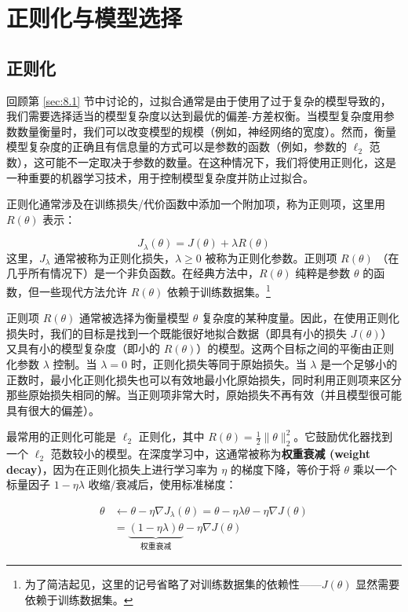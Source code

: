 \chapter{正则化与模型选择}\label{chapter:9}

\section{正则化}\label{sec:9.1}

回顾第 \ref{sec:8.1} 节中讨论的，过拟合通常是由于使用了过于复杂的模型导致的，我们需要选择适当的模型复杂度以达到最优的偏差-方差权衡。当模型复杂度用参数数量衡量时，我们可以改变模型的规模（例如，神经网络的宽度）。然而，衡量模型复杂度的正确且有信息量的方式可以是参数的函数（例如，参数的 $\ell_2$ 范数），这可能不一定取决于参数的数量。在这种情况下，我们将使用正则化，这是一种重要的机器学习技术，用于控制模型复杂度并防止过拟合。

正则化通常涉及在训练损失/代价函数中添加一个附加项，称为正则项，这里用 $R(\theta)$ 表示：

\begin{equation}
    J_\lambda(\theta) = J(\theta) + \lambda R(\theta)
    \label{eq:9.1}
\end{equation}
这里，$J_\lambda$ 通常被称为正则化损失，$\lambda \geq 0$ 被称为正则化参数。正则项 $R(\theta)$ （在几乎所有情况下）是一个非负函数。在经典方法中，$R(\theta)$ 纯粹是参数 $\theta$ 的函数，但一些现代方法允许 $R(\theta)$ 依赖于训练数据集。\footnote{为了简洁起见，这里的记号省略了对训练数据集的依赖性——$J(\theta)$ 显然需要依赖于训练数据集。}

正则项 $R(\theta)$ 通常被选择为衡量模型 $\theta$ 复杂度的某种度量。因此，在使用正则化损失时，我们的目标是找到一个既能很好地拟合数据（即具有小的损失 $J(\theta)$）又具有小的模型复杂度（即小的 $R(\theta)$）的模型。这两个目标之间的平衡由正则化参数 $\lambda$ 控制。当 $\lambda = 0$ 时，正则化损失等同于原始损失。当 $\lambda$ 是一个足够小的正数时，最小化正则化损失也可以有效地最小化原始损失，同时利用正则项来区分那些原始损失相同的解。当正则项非常大时，原始损失不再有效（并且模型很可能具有很大的偏差）。

最常用的正则化可能是 $\ell_2$ 正则化，其中 $R(\theta) = \frac{1}{2}\|\theta\|_2^2$。它鼓励优化器找到一个 $\ell_2$ 范数较小的模型。在深度学习中，这通常被称为\textbf{权重衰减 (weight decay)}，因为在正则化损失上进行学习率为 $\eta$ 的梯度下降，等价于将 $\theta$ 乘以一个标量因子 $1 - \eta\lambda$ 收缩/衰减后，使用标准梯度：

\begin{align}
    \theta &\leftarrow \theta - \eta \nabla J_\lambda(\theta) = \theta - \eta \lambda \theta - \eta \nabla J(\theta) \nonumber \\
    &= \underbrace{(1 - \eta \lambda)\theta}_{\text{权重衰减}} - \eta \nabla J(\theta)
    \label{eq:9.2}
\end{align}

